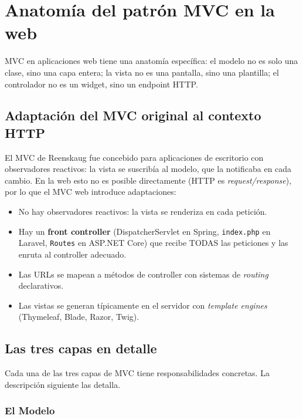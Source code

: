 \section{Anatomía del patrón MVC en la web}

MVC en aplicaciones web tiene una anatomía específica: el
modelo no es solo una clase, sino una capa entera; la vista no es
una pantalla, sino una plantilla; el controlador no es un widget,
sino un endpoint HTTP.


\subsection{Adaptación del MVC original al contexto HTTP}

El MVC de Reenskaug fue concebido para aplicaciones de escritorio
con observadores reactivos: la vista se suscribía al modelo, que la
notificaba en cada cambio. En la web esto no es posible directamente
(HTTP es \emph{request/response}), por lo que el MVC web introduce
adaptaciones:

\begin{itemize}
\item No hay observadores reactivos: la vista se renderiza en cada
petición.
\item Hay un \textbf{front controller} (DispatcherServlet en Spring,
\texttt{index.php} en Laravel, \texttt{Routes} en ASP.NET Core) que
recibe TODAS las peticiones y las enruta al controller adecuado.
\item Las URLs se mapean a métodos de controller con sistemas de
\emph{routing} declarativos.
\item Las vistas se generan típicamente en el servidor con
\emph{template engines} (Thymeleaf, Blade, Razor, Twig).
\end{itemize}

\subsection{Las tres capas en detalle}

Cada una de las tres capas de MVC tiene responsabilidades
concretas. La descripción siguiente las detalla.


\subsubsection{El Modelo}

